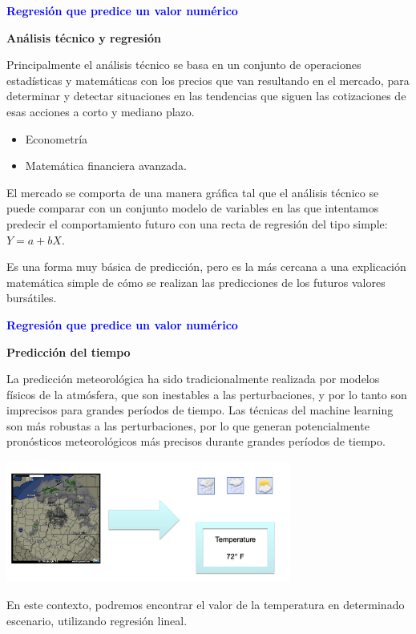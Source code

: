 \documentclass[11pt]{beamer}
\begin{document}
\begin{frame}{\textbf{\textcolor{blue}{Regresi\'on que predice un valor num\'erico}}}
	\vspace{0.2cm}

\textbf{An\'alisis t\'ecnico y regresi\'on}

\scriptsize{Principalmente el an\'alisis t\'ecnico se basa en un conjunto de operaciones estad\'isticas y matem\'aticas con los precios que van resultando en el mercado, para determinar y detectar situaciones en las tendencias que siguen las cotizaciones de esas acciones a corto y mediano plazo.
	
\begin{itemize}
	\item Econometr\'ia
	\item Matem\'atica financiera avanzada.
\end{itemize}	

El mercado se comporta de una manera gr\'afica tal que el an\'alisis t\'ecnico se puede comparar con un conjunto modelo de variables en las que intentamos predecir el comportamiento futuro con una recta de regresi\'on del tipo simple: $Y= a + bX$.

Es una forma muy b\'asica de predicci\'on, pero es la m\'as cercana a una explicaci\'on matem\'atica simple de c\'omo se realizan las predicciones de los futuros valores burs\'atiles.
}
	
\end{frame}

\begin{frame}{\textbf{\textcolor{blue}{Regresi\'on que predice un valor num\'erico}}}
	\vspace{0.2cm}
	
	\textbf{Predicci\'on del tiempo}
	
\scriptsize{La predicci\'on meteorol\'ogica ha sido tradicionalmente realizada por modelos f\'isicos de la atm\'osfera, que son inestables a las perturbaciones, y por lo tanto son imprecisos para grandes per\'iodos de tiempo. Las t\'ecnicas del machine learning son m\'as robustas a las perturbaciones,  por lo que  generan potencialmente pron\'osticos meteorol\'ogicos m\'as precisos durante grandes per\'iodos de tiempo.
	
\vspace{0.3cm}

\centering
\includegraphics[width=0.7\textwidth]{ML5.png}	

En este contexto, podremos encontrar el valor de la temperatura en determinado escenario, utilizando regresi\'on lineal.}
\end{frame}
\end{document}

